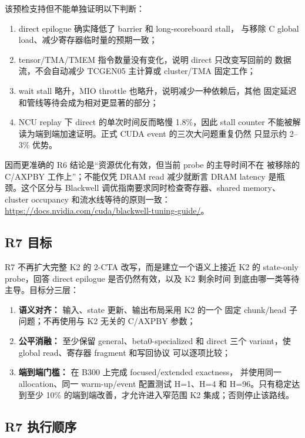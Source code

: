 该预检支持但不能单独证明以下判断：

\begin{enumerate}
\item direct epilogue 确实降低了 barrier 和 long-scoreboard stall，
      与移除 C global load、减少寄存器临时量的预期一致；
\item tensor/TMA/TMEM 指令数量没有变化，说明 direct 只改变写回前的
      数据流，不会自动减少 TCGEN05 主计算或 cluster/TMA 固定工作；
\item wait stall 略升，MIO throttle 也略升，说明减少一种依赖后，其他
      固定延迟和管线等待会成为相对更显著的部分；
\item NCU replay 下 direct 的单次时间反而略慢 1.8\%，因此 stall counter
      不能被解读为端到端加速证明。正式 CUDA event 的三次大问题重复仍然
      只显示约 2--3\% 优势。
\end{enumerate}

因而更准确的 R6 结论是“资源优化有效，但当前 probe 的主导时间不在
被移除的 C/AXPBY 工作上”；不能仅凭 DRAM read 减少就断言 DRAM latency
是瓶颈。这个区分与 Blackwell 调优指南要求同时检查寄存器、shared memory、
cluster occupancy 和流水线等待的原则一致：
\url{https://docs.nvidia.com/cuda/blackwell-tuning-guide/}。

\subsection{R7 目标}

R7 不再扩大完整 K2 的 2-CTA 改写，而是建立一个语义上接近 K2 的
state-only probe，回答 direct epilogue 是否仍然有效，以及 K2 剩余时间
到底由哪一类等待主导。目标分三层：

\begin{enumerate}
\item \textbf{语义对齐：} 输入、state 更新、输出布局采用 K2 的一个
      固定 chunk/head 子问题；不再使用与 K2 无关的 C/AXPBY 参数；
\item \textbf{公平消融：} 至少保留 general、beta0-specialized 和
      direct 三个 variant，使 global read、寄存器 fragment 和写回协议
      可以逐项比较；
\item \textbf{端到端门槛：} 在 B300 上完成 focused/extended exactness，
      并使用同一 allocation、同一 warm-up/event 配置测试 H=1、H=4 和
      H=96。只有稳定达到至少 10\% 的端到端改善，才允许进入窄范围 K2
      集成；否则停止该路线。
\end{enumerate}

\subsection{R7 执行顺序}

